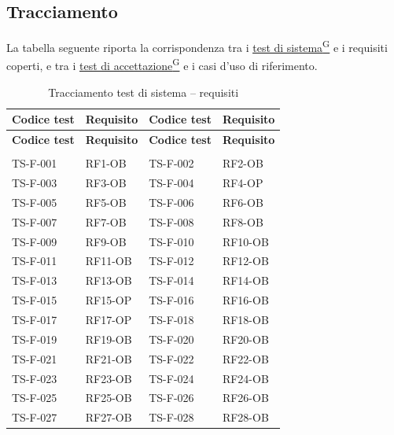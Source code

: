 \documentclass[a4paper,12pt]{article}
\providecommand{\glslink}[2]{\href{https://alittlebyte-19.github.io/Documentazione/glossario.html\#gls-#1}{\underline{#2}\textsuperscript{\scriptsize G}}}
\begin{document}
\subsection{Tracciamento}
La tabella seguente riporta la corrispondenza tra i \glslink{test-di-sistema}{test di sistema} e i requisiti coperti, e tra i \glslink{test-di-accettazione}{test di accettazione} e i casi d'uso di riferimento.

{\footnotesize
\renewcommand{\arraystretch}{1.1}
\begin{longtable}{|p{2.5cm}|p{2.2cm}|p{2.5cm}|p{2.2cm}|}
    \caption{Tracciamento test di sistema -- requisiti} \label{tab:tracciamento-ts} \\
    \hline
    \rowcolor{gray!20}
    \textbf{Codice test} & \textbf{Requisito} & \textbf{Codice test} & \textbf{Requisito} \\
    \hline
    \endfirsthead
    \hline
    \rowcolor{gray!20}
    \textbf{Codice test} & \textbf{Requisito} & \textbf{Codice test} & \textbf{Requisito} \\
    \hline
    \endhead
    \hline
    \endfoot
    \hline
    \endlastfoot
    \multicolumn{4}{|l|}{\cellcolor{gray!12}\textbf{Funzionali}} \\
    \hline
    TS-F-001 & RF1-OB & TS-F-002 & RF2-OB \\
    \hline
    TS-F-003 & RF3-OB & TS-F-004 & RF4-OP \\
    \hline
    TS-F-005 & RF5-OB & TS-F-006 & RF6-OB \\
    \hline
    TS-F-007 & RF7-OB & TS-F-008 & RF8-OB \\
    \hline
    TS-F-009 & RF9-OB & TS-F-010 & RF10-OB \\
    \hline
    TS-F-011 & RF11-OB & TS-F-012 & RF12-OB \\
    \hline
    TS-F-013 & RF13-OB & TS-F-014 & RF14-OB \\
    \hline
    TS-F-015 & RF15-OP & TS-F-016 & RF16-OB \\
    \hline
    TS-F-017 & RF17-OP & TS-F-018 & RF18-OB \\
    \hline
    TS-F-019 & RF19-OB & TS-F-020 & RF20-OB \\
    \hline
    TS-F-021 & RF21-OB & TS-F-022 & RF22-OB \\
    \hline
    TS-F-023 & RF23-OB & TS-F-024 & RF24-OB \\
    \hline
    TS-F-025 & RF25-OB & TS-F-026 & RF26-OB \\
    \hline
    TS-F-027 & RF27-OB & TS-F-028 & RF28-OB \\

\end{longtable}}
\end{document}
